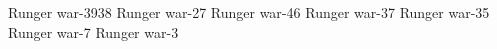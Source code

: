 \newcommand{\Delaen}           {Delaen\xspace} %

\newcommand{\Delphine}         {Iscari\ahresphan{}\xspace} 

\newcommand{\Zether}           {Zether\xspace}%

\begin{comment}
\subsubsection{Scathae}
\end{comment}

\newcommand{\Byakun}           {Byak\ulong{}n\xspace}%









\begin{comment}
\section{Pelidorians}
\end{comment}

\begin{comment}
\subsubsection{House Pelidor}
\end{comment}


\newcommand{\Dornaer}          {Dornaer\xspace} %
\newcommand{\Icor}             {Icor\xspace}   %
\newcommand{\Tiroco}           {Tiroco\xspace} %
\newcommand{\Sethgal}          {Sethgal\xspace} %

          {Runger war}{-39}{38}
        {Runger war}{-27}
       {Runger war}{-46}
        {Runger war}{-37}
       {Runger war}{-35}
         {Runger war}{-7}
         {Runger war}{-3}


\begin{comment}
\subsubsection{At the court in Malcur}
\end{comment}

